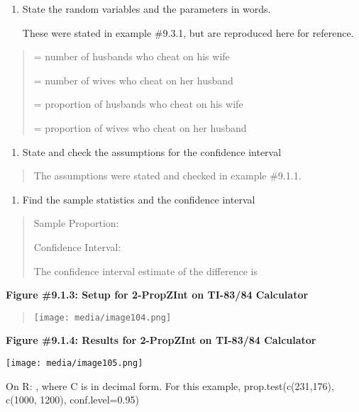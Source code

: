 \documentclass[]{book}
\providecommand{\tightlist}{%
  \setlength{\itemsep}{0pt}\setlength{\parskip}{0pt}}
\begin{document}
\begin{enumerate}
\def\labelenumi{\arabic{enumi}.}
\item
  State the random variables and the parameters in words.

  These were stated in example \#9.3.1, but are reproduced here for
  reference.
\end{enumerate}

\begin{quote}
= number of husbands who cheat on his wife

= number of wives who cheat on her husband

= proportion of husbands who cheat on his wife

= proportion of wives who cheat on her husband
\end{quote}

\begin{enumerate}
\def\labelenumi{\arabic{enumi}.}
\setcounter{enumi}{1}
\tightlist
\item
  State and check the assumptions for the confidence interval
\end{enumerate}

\begin{quote}
The assumptions were stated and checked in example \#9.1.1.
\end{quote}

\begin{enumerate}
\def\labelenumi{\arabic{enumi}.}
\setcounter{enumi}{2}
\tightlist
\item
  Find the sample statistics and the confidence interval
\end{enumerate}

\begin{quote}
Sample Proportion:

Confidence Interval:

The confidence interval estimate of the difference is
\end{quote}

\textbf{Figure \#9.1.3: Setup for 2-PropZInt on TI-83/84 Calculator}

\begin{quote}
\texttt{[image: media/image104.png]}
\end{quote}

\textbf{Figure \#9.1.4: Results for 2-PropZInt on TI-83/84 Calculator}

\texttt{[image: media/image105.png]}

On R: , where C is in decimal form. For this example,
prop.test(c(231,176), c(1000, 1200), conf.level=0.95)
\end{document}
